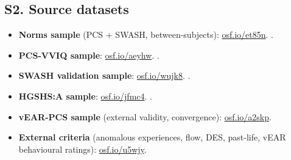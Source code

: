 \documentclass[12pt,a4paper]{article}
\begin{document}
\subsection*{S2. Source datasets}

\begin{itemize}
  \item \textbf{Norms sample} (PCS + SWASH, between-subjects):
    \url{osf.io/et85n}. \citet{lush2021pcs}.
  \item \textbf{PCS-VVIQ sample}:
    \url{osf.io/aeyhw}. \citet{lush2021pcs}.
  \item \textbf{SWASH validation sample}:
    \url{osf.io/wujk8}. \citet{lush2018swash}.
  \item \textbf{HGSHS:A sample}:
    \url{osf.io/jfmc4}. \citet{acunzo2021standardized}.
  \item \textbf{vEAR-PCS sample} (external validity, convergence):
    \url{osf.io/a2skp}.
  \item \textbf{External criteria} (anomalous experiences, flow, DES,
    past-life, vEAR behavioural ratings):
    \url{osf.io/u5wjy}.
\end{itemize}



\end{document}
